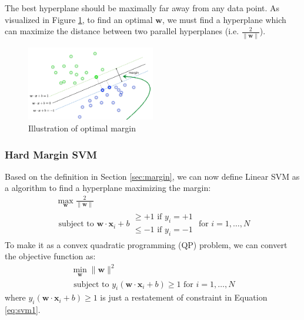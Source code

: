 \documentclass[11pt]{article}
\begin{document}
\normalfont
The best hyperplane should be maximally far away from any data point. As visualized in Figure \ref{fig:margin}, to find an optimal $\mathbf{w}$, we must find a hyperplane which can maximize the distance between two parallel hyperplanes (i.e. $\frac{2}{\|\mathbf{w}\|}$).


\begin{figure}[H]
\centering
\includegraphics[width=0.5\textwidth]{margin.png}
\caption{Illustration of optimal margin}
\label{fig:margin}
\end{figure}

\subsubsection{Hard Margin SVM}
Based on the definition in Section \ref{sec:margin}, we can now define Linear SVM as a algorithm to find a hyperplane maximizing the margin:
\begin{equation}
\begin{array}{c}
\max\limits_{\boldsymbol{w}} \frac{2}{\|\boldsymbol{w}\|} \\
\text { subject to } \boldsymbol{w} \cdot \boldsymbol{x}_{i}+b \begin{array}{l}
\geq+1 \text { if } y_{i}=+1 \\
\leq-1 \text { if } y_{i}=-1
\end{array} \text { for } i=1, \ldots, N
\end{array}
\label{eq:svm1}
\end{equation}
To make it as a convex quadratic programming (QP) problem, we can convert the objective function as:
\begin{equation}
\begin{array}{c}
\min _{\boldsymbol{w}}\|\boldsymbol{w}\|^{2} \\
\text{ subject to } y_{i}\left(\boldsymbol{w} \cdot \boldsymbol{x}_{i}+b\right) \geq 1 \text{ for } i=1, \ldots, N
\end{array}
\label{eq:hardsvm}
\end{equation}
where $y_{i}\left(\boldsymbol{w} \cdot \boldsymbol{x}_{i}+b\right) \geq 1$ is just a restatement of constraint in Equation \ref{eq:svm1}.
\end{document}
